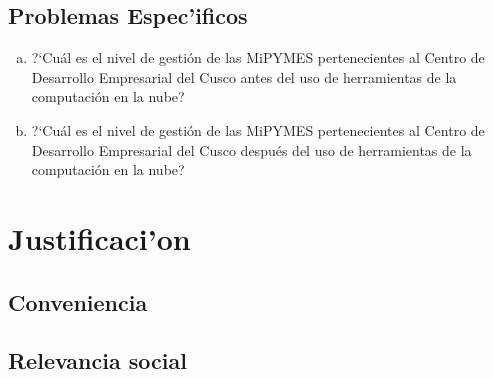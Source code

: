 \subsection{Problemas Espec'ificos}
\begin{enumerate}[a.]
\item ?`Cu\'al es el nivel de gesti\'on de las MiPYMES pertenecientes al Centro
de Desarrollo Empresarial del Cusco antes del uso de herramientas de la computaci\'on
en la nube?
\item ?`Cu\'al es el nivel de gesti\'on de las MiPYMES pertenecientes al Centro
de Desarrollo Empresarial del Cusco despu\'es del uso de herramientas de la computaci\'on
en la nube?
\end{enumerate}
%
%
\section{Justificaci'on}
\subsection{Conveniencia}

\subsection{Relevancia social}

